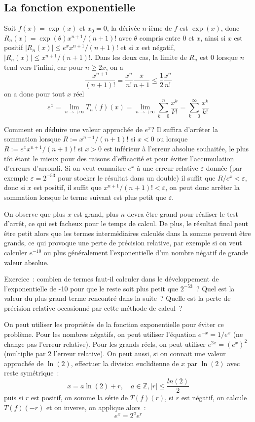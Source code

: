 \documentclass[a4paper,11pt]{article}
\newcommand{\Z}{{\mathbb{Z}}}
\begin{document}
\subsection{La fonction exponentielle}
Soit $f(x)=\exp(x)$ et $x_0=0$, la dérivée $n$-ième de $f$ 
est $\exp(x)$, donc $R_n(x)=\exp(\theta)x^{n+1}/(n+1)!$ avec $\theta$
compris entre 0 et $x$, ainsi si $x$ est positif 
$|R_n(x)| \leq e^x x^{n+1}/(n+1)!$ et si $x$ est négatif,
$|R_n(x)| \leq x^{n+1}/(n+1)!$. Dans les deux cas, la limite de $R_n$
est 0 lorsque $n$ tend vers l'infini, car pour $n \geq 2x$, on a
\[ \frac{x^{n+1}}{(n+1)!} = \frac{x^n}{n!} \frac{x}{n+1}\leq 
\frac{1}{2}\frac{x^n}{n!}\]
on a donc pour tout $x$ réel
\[ e^x = \lim_{n \rightarrow +\infty} T_n(f)(x)
= \lim_{n \rightarrow +\infty} \sum_{k=0}^n \frac{x^k}{k!}
= \sum_{k=0}^\infty \frac{x^k}{k!} \]

Comment en déduire une valeur approchée de $e^x$? Il suffira d'arr\^eter
la sommation lorsque $R:=x^{n+1}/(n+1)!$ si $x<0$ ou lorsque
$R:=e^x x^{n+1}/(n+1)!$ si $x>0$ est inférieur à 
l'erreur absolue souhaitée, le plus tôt étant le mieux pour des
raisons d'efficacité et pour éviter l'accumulation d'erreurs
d'arrondi. 
Si on veut connaitre $e^x$ à une erreur relative $\varepsilon$ donnée
(par exemple $\varepsilon=2^{-53}$ pour stocker le résultat dans un double)
il suffit que $R/e^x < \varepsilon$, donc si $x$ est positif, il suffit
que $x^{n+1}/(n+1)!<\varepsilon$, on peut donc arrêter la sommation
lorsque le terme suivant est plus petit que $\varepsilon$.

On observe que plus $x$ est grand, plus $n$ devra
être grand pour réaliser le test d'arrêt, ce qui est facheux
pour le temps de calcul.
De plus, le résultat final peut être petit alors que les termes
intermédiaires calculés dans la somme peuvent être grands, ce qui
provoque une perte de précision relative, par exemple si on
veut calculer $e^{-10}$ ou plus généralement l'exponentielle
d'un nombre négatif de grande valeur absolue.

Exercice~: combien de termes faut-il calculer dans le développement
de l'exponentielle de -10 pour que le reste soit plus petit
que $2^{-53}$~? Quel est la valeur du plus grand terme rencontré dans
la suite~? Quelle est la perte de précision relative occasionné
par cette méthode de calcul~?

On peut utiliser les propriétés de la fonction exponentielle
pour éviter ce problème. Pour les nombres négatifs, on peut
utiliser l'équation $e^{-x}=1/e^x$ (ne change pas l'erreur relative). 
Pour les grands réels, on peut utiliser $e^{2x}=(e^x)^2$
(multiplie par 2 l'erreur relative).
On peut aussi, si on connait une valeur approchée
de $\ln(2)$, effectuer la division euclidienne de $x$ par $\ln(2)$ 
avec reste symétrique~:
\[ x = a \ln(2) + r, \quad a \in \Z, |r| \leq \frac{ln(2)}{2} \]
puis si $r$ est positif, on somme la série de $T(f)(r)$, si $r$
est négatif, on calcule $T(f)(-r)$ et on inverse, on applique alors~:
\[ e^x = 2^a e^r \]
\end{document}
